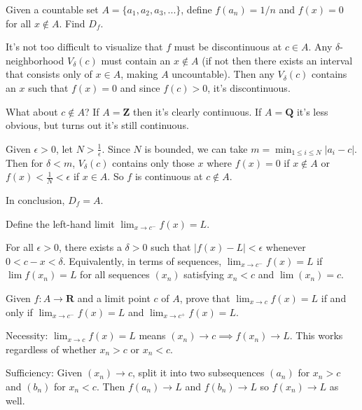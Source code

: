 \documentclass{oxmathproblems}
\begin{document}
\begin{questions}
\miquestion Given a countable set $A = \{a_{1}, a_{2}, a_{3}, ...\}$, define $f(a_{n}) = 1/n$ and $f(x)=0$ for all $x \notin A$. Find $D_{f}$.
\begin{solution}
  It's not too difficult to visualize that $f$ must be discontinuous at $c \in A$. Any $\delta$-neighborhood  $V_{\delta}(c)$ must contain an
  $x \notin A$ (if not then there exists an interval that consists only of $x \in A$, making $A$ uncountable). Then any $V_\delta(c)$ contains an
  $x$ such that $f(x)=0$ and since $f(c) > 0$, it's discontinuous.

  What about $c \notin A$? If $A=\textbf{Z}$ then it's clearly continuous. If $A = \textbf{Q}$ it's less obvious, but turns out it's still continuous.

  Given $\epsilon > 0$, let $N > \frac{1}{\epsilon}$. Since $N$ is bounded, we can take $m = \min_{1 \leq i \leq N}|a_{i}-c|$.
  Then for $\delta < m$, $V_\delta(c)$ contains only those $x$ where $f(x)=0$ if $x \notin A$ or $f(x) < \frac{1}{N} < \epsilon$ if $x \in A$.
  So $f$ is continuous at $c \notin A$.

  In conclusion, $D_{f}=A$.
\end{solution}

\miquestion Define the left-hand limit $\lim_{x \to c^{-}}f(x) = L$.
\begin{solution}
  For all $\epsilon > 0$, there exists a $\delta > 0$ such that $|f(x)-L| < \epsilon$ whenever $0< c-x < \delta$.
  Equivalently, in terms of sequences, $\lim_{x \to c^{-}}f(x) = L$ if $\lim f({x_{n}})=L$ for all sequences $(x_{n})$ satisfying $x_{n} < c$ and $\lim(x_{n})=c$.
\end{solution}

\miquestion Given $f: A \to \textbf{R}$ and a limit point $c$ of $A$, prove that $\lim_{x \to c}f(x) = L$ if and only if  $\lim_{x \to c^{-}}f(x) = L$ and  $\lim_{x \to c^{+}}f(x) = L$.
\begin{solution}
  Necessity: $\lim_{x \to c}f(x) = L$ means $(x_{n}) \to c \implies f(x_{n}) \to L$. This works regardless of whether $x_{n} > c$ or $x_{n} < c$.
  
  Sufficiency: Given $(x_{n}) \to c$, split it into two subsequences $(a_{n})$ for $x_{n} > c$ and $(b_{n})$ for $x_{n} < c$. Then $f(a_{n}) \to L$ and $f(b_{n}) \to L$
  so $f(x_{n}) \to L$ as well.
\end{solution}


\end{questions}
\end{document}
